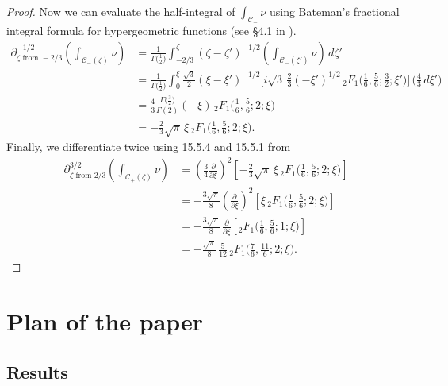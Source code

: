 \documentclass{article}
\theoremstyle{definition}
\begin{document}
\begin{proof}
Now we can evaluate the half-integral of $\int_{\mathcal{C}_-} \nu$ using Bateman's fractional integral formula for hypergeometric functions (see \S 4.1 in \cite{koornwinder2015fractional}).
\begin{align*}
\partial^{-1/2}_{\zeta \text{ from } -2/3} \left( \int_{\mathcal{C}_-(\zeta)} \nu \right) & = \frac{1}{\Gamma\big(\tfrac{1}{2}\big)} \int_{-2/3}^\zeta (\zeta - \zeta')^{-1/2} \left( \int_{\mathcal{C}_-(\zeta')} \nu \right)\,d\zeta' \\
& = \frac{1}{\Gamma\big(\tfrac{1}{2}\big)} \int_0^\xi \tfrac{\sqrt{3}}{2} (\xi - \xi')^{-1/2} \Big[{i}{\sqrt{3}}\,\tfrac{2}{3} (-\xi')^{1/2}\, {}_2F_1\big(\tfrac{1}{6}, \tfrac{5}{6}; \tfrac{3}{2}; \xi' \big) \Big] \,\big( \tfrac{4}{3}\,d\xi' \big) \\
& =  \frac{4}{3} \frac{\Gamma\big(\tfrac{3}{2}\big)}{\Gamma(2)} (-\xi)\, {}_2F_1\big(\tfrac{1}{6}, \tfrac{5}{6}; 2; \xi\big) \\
& = - \frac{2}{3} \sqrt{\pi}\,\xi\,{}_2F_1\big(\tfrac{1}{6}, \tfrac{5}{6}; 2; \xi\big).
\end{align*}
Finally, we differentiate twice using 15.5.4 and 15.5.1 from \cite{dlmf}
\begin{align*}
\partial^{3/2}_{\zeta \text{ from } 2/3} \left( \int_{\mathcal{C}_+(\zeta)} \nu \right) & = \left(\tfrac{3}{4} \tfrac{\partial}{\partial \xi}\right)^2 \left[ - \frac{2}{3} \sqrt{\pi}\,\xi\, {}_2F_1\big(\tfrac{1}{6}, \tfrac{5}{6}; 2; \xi\big) \right] \\
& = - \tfrac{3\sqrt{\pi}}{8} \left(\tfrac{\partial}{\partial \xi}\right)^2 \left[ \xi\, {}_2F_1\big(\tfrac{1}{6}, \tfrac{5}{6}; 2; \xi\big) \right] \\
& = - \tfrac{3\sqrt{\pi}}{8}\,\tfrac{\partial}{\partial \xi} \left[ {}_2F_1\big(\tfrac{1}{6}, \tfrac{5}{6}; 1; \xi\big) \right] \\
& = - \tfrac{\sqrt{\pi}}{8}\,\tfrac{5}{12}\, {}_2F_1\big(\tfrac{7}{6}, \tfrac{11}{6}; 2; \xi\big).
\end{align*}
\end{proof}

\color{black}

\section{Plan of the paper}
\subsection{Results}
\end{document}
